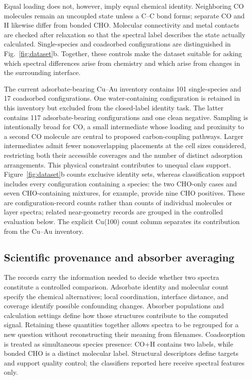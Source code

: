 \documentclass[11pt,a4paper]{article}
\begin{document}
Equal loading does not, however, imply equal chemical identity. Neighboring CO molecules remain an uncoupled state unless a C--C bond forms; separate CO and H likewise differ from bonded CHO. Molecular connectivity and metal contacts are checked after relaxation so that the spectral label describes the state actually calculated. Single-species and coadsorbed configurations are distinguished in Fig.~\ref{fig:dataset}b. Together, these controls make the dataset suitable for asking which spectral differences arise from chemistry and which arise from changes in the surrounding interface.

The current adsorbate-bearing Cu--Au inventory contains 101 single-species and 17 coadsorbed configurations. One water-containing configuration is retained in this inventory but excluded from the closed-label identity task. The latter contains 117 adsorbate-bearing configurations and one clean negative. Sampling is intentionally broad for CO, a small intermediate whose loading and proximity to a second CO molecule are central to proposed carbon-coupling pathways. Larger intermediates admit fewer nonoverlapping placements at the cell sizes considered, restricting both their accessible coverages and the number of distinct adsorption arrangements. This physical constraint contributes to unequal class support. Figure~\ref{fig:dataset}b counts exclusive identity sets, whereas classification support includes every configuration containing a species: the two CHO-only cases and seven CHO-containing mixtures, for example, provide nine CHO positives. These are configuration-record counts rather than counts of individual molecules or layer spectra; related near-geometry records are grouped in the controlled evaluation below. The explicit Cu(100) count column separates its contribution from the Cu--Au inventory.


\subsection{Scientific provenance and absorber averaging}
The records carry the information needed to decide whether two spectra constitute a controlled comparison. Adsorbate identity and molecular count specify the chemical alternatives; local coordination, interface distance, and coverage identify possible confounding changes. Absorber populations and calculation settings define how those structures contribute to the computed signal. Retaining these quantities together allows spectra to be regrouped for a new question without reconstructing their meaning from filenames. Coadsorption is treated as simultaneous species presence: CO+H contains two labels, while bonded CHO is a distinct molecular label. Structural descriptors define targets and support quality control; the classifiers reported here receive spectral features only.
\end{document}
